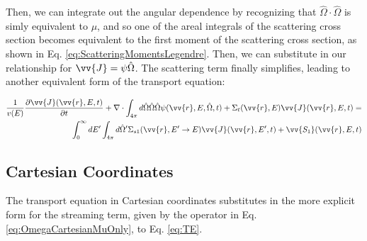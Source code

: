\documentclass[10pt]{article}
\begin{document}
\begin{flushleft}

Then, we can integrate out the angular dependence by recognizing that \(\hat{\Omega}\cdot\hat{\Omega}\) is simly equivalent to \(\mu\), and so one of the areal integrals of the scattering cross section becomes equivalent to the first moment of the scattering cross section, as shown in Eq. \ref{eq:ScatteringMomentsLegendre}. Then, we can substitute in our relationship for \(\vv{J} = \psi\hat{\Omega}\). The scattering term finally simplifies, leading to another equivalent form of the transport equation:

\begin{equation}
\label{eq:TEAngleAngleIntegrated2}
\begin{aligned}
\frac{1}{v(E)} \frac{\partial\vv{J}(\vv{r}, E, t)}{\partial t} +
 \nabla\cdot \int_{4\pi}^{} d\hat{\Omega} \hat{\Omega}\hat{\Omega}\psi(\vv{r}, E, \hat{\Omega},t) + 
 \Sigma_t(\vv{r},E)\vv{J}(\vv{r}, E, t) = \\
 \int_{0}^{\infty}dE' \int_{4\pi}^{ } d\hat{\Omega}' \Sigma_{s1}(\vv{r}, E'\rightarrow E)\vv{J}(\vv{r}, E', t) + \vv{S_1}(\vv{r}, E, t)\\
\end{aligned}
\end{equation}

\subsection{Cartesian Coordinates}

The transport equation in Cartesian coordinates substitutes in the more explicit form for the streaming term, given by the operator in Eq. \ref{eq:OmegaCartesianMuOnly}, to Eq. \ref{eq:TE}. 


\end{flushleft}
\end{document}
